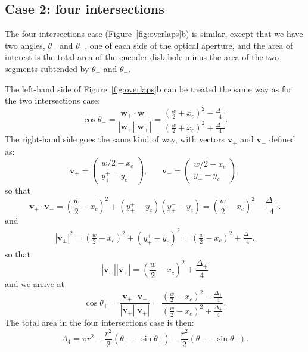 \documentclass[a4paper,11pt,article]{memoir}
\begin{document}
\subsection*{Case 2: four intersections}

The four intersections case (Figure~\ref{fig:overlaps}b) is similar,
except that we have two angles, $\theta_{-}$ and $\theta_{-}$, one of
each side of the optical aperture, and the area of interest is the
total area of the encoder disk hole minus the area of the two segments
subtended by $\theta_{-}$ and $\theta_{-}$.

The left-hand side of Figure~\ref{fig:overlaps}b can be treated the
same way as for the two intersections case:
\begin{equation}
  \cos \theta_{-} = \frac{\mathbf{w}_{+} \cdot
    \mathbf{w}_{-}}{|\mathbf{w}_{+}| |\mathbf{w}_{+}|} =
  \frac{{\left(\frac{w}{2} + x_c\right)}^2 -
    \frac{\Delta_{-}}{4}}{{\left(\frac{w}{2} + x_c\right)}^2 +
    \frac{\Delta_{-}}{4}}.
\end{equation}
The right-hand side goes the same kind of way, with vectors
$\mathbf{v}_{+}$ and $\mathbf{v}_{-}$ defined as:
\begin{equation}
  \mathbf{v}_{+} = \begin{pmatrix}
    w/2 - x_c \\
    y_{+}^{+} - y_c
  \end{pmatrix}, \;\;\;\;\;\;
  \mathbf{v}_{-} = \begin{pmatrix}
    w/2 - x_c \\
    y_{+}^{-} - y_c
  \end{pmatrix},
\end{equation}
so that
\begin{equation}
  \mathbf{v}_{+} \cdot \mathbf{v}_{-} = {\left(\frac{w}{2} -
    x_c\right)}^2 + (y_{+}^{+} - y_c) (y_{+}^{-} - y_c) =
         {\left(\frac{w}{2} - x_c\right)}^2 - \frac{\Delta_{+}}{4}.
\end{equation}
and
\begin{align*}
  |\mathbf{v}_{\pm}|^2 = {\left(\frac{w}{2} - x_c\right)}^2 + {(y_{+}^{\pm} -
  y_c)}^2 = {\left(\frac{w}{2} - x_c\right)}^2 + \frac{\Delta_{+}}{4}.
\end{align*}
so that
\begin{equation*}
  |\mathbf{v}_{+}| |\mathbf{v}_{+}| = {\left(\frac{w}{2} -
    x_c\right)}^2 + \frac{\Delta_{+}}{4}
\end{equation*}
and we arrive at
\begin{equation*}
  \cos \theta_{+} = \frac{\mathbf{v}_{+} \cdot
    \mathbf{v}_{-}}{|\mathbf{v}_{+}| |\mathbf{v}_{+}|} =
  \frac{{\left(\frac{w}{2} - x_c\right)}^2 -
    \frac{\Delta_{+}}{4}}{{\left(\frac{w}{2} - x_c\right)}^2 +
    \frac{\Delta_{+}}{4}}.
\end{equation*}
The total area in the four intersections case is then:
\begin{equation*}
  A_4 = \pi r^2 - \frac{r^2}{2} (\theta_{+} - \sin \theta_{+}) -
  \frac{r^2}{2} (\theta_{-} - \sin \theta_{-}).
\end{equation*}
\end{document}
